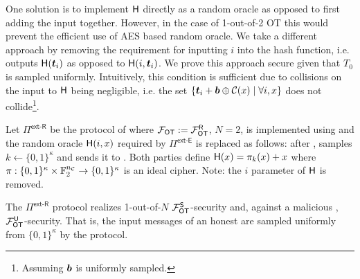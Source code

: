 One solution is to implement $\mathsf{H}$ directly as a random oracle as opposed to first adding the input together. However, in the case of 1-out-of-2 OT this would prevent the efficient use of AES based random oracle. We take a different approach by removing the requirement for inputting $i$ into the hash function, i.e. \rec outputs $\mathsf{H}(\boldsymbol{t}_i)$ as opposed to $\mathsf{H}(i,\boldsymbol{t}_i)$. We prove this approach secure given that $T_0$ is sampled uniformly. Intuitively, this condition is sufficient due to collisions on the input to $\mathsf{H}$ being negligible, i.e. the set $\{\boldsymbol{t}_i + \boldsymbol{b}\oplus\mathcal{C}(x) \mid \forall i,x\}$ does not collide\footnote{Assuming $\boldsymbol{b}$ is uniformly sampled.}.

\begin{definition}\label{def:ext_R_S}
	Let $\Pi^{\textsf{ext-R}}$ be the protocol of  where $\mathcal{F}_{\mathsf{OT}}:=\mathcal{F}_{\mathsf{OT}}^\mathsf{R}$, $N=2$,  is implemented using \cite{C:KelOrsSch15} and the random oracle $\mathsf{H}(i,x)$ required by $\Pi^{\textsf{ext-E}}$ is replaced as follows: after , \send samples $k\gets\{0,1\}^{\kappa}$ and sends it to \rec. Both parties define $\mathsf{H}(x)=\pi_k(x)+x$ where $\pi:\{0,1\}^{\kappa} \times \mathbb{F}^{{n_\mathcal{C}}}_2 \rightarrow\{0,1\}^\kappa$ is an ideal cipher. Note: the $i$ parameter of $\mathsf{H}$ is removed.
\end{definition}
\begin{lemma}\label{lem:ext_R_S}
	The $\Pi^{\textsf{ext-R}}$ protocol realizes 1-out-of-$N$ $\mathcal{F}_{\mathsf{OT}}^\mathsf{S}$-security and, against a malicious \rec, $\mathcal{F}_{\mathsf{OT}}^\mathsf{U}$-security. That is, the input messages of an honest \send are sampled uniformly from $\{0,1\}^\kappa$ by the protocol.
\end{lemma}
